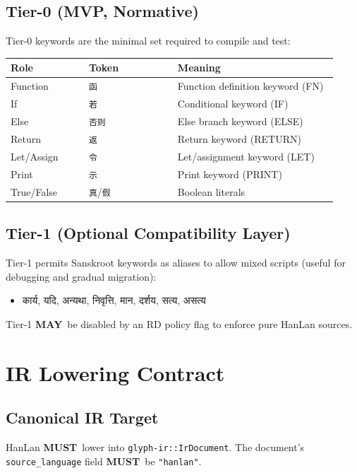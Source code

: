 \documentclass[12pt]{article}
\newcommand{\textdevanagarifont}[1]{{\devanagarifont #1}}
\newcommand{\MUST}{\textbf{MUST}}
\newcommand{\MAY}{\textbf{MAY}}
\begin{document}
\subsection{Tier-0 (MVP, Normative)}
Tier-0 keywords are the minimal set required to compile and test:
\begin{longtable}{p{0.22\linewidth}p{0.25\linewidth}p{0.45\linewidth}}
\textbf{Role} & \textbf{Token} & \textbf{Meaning} \\ \hline
Function & \texttt{函} & Function definition keyword (FN) \\
If & \texttt{若} & Conditional keyword (IF) \\
Else & \texttt{否则} & Else branch keyword (ELSE) \\
Return & \texttt{返} & Return keyword (RETURN) \\
Let/Assign & \texttt{令} & Let/assignment keyword (LET) \\
Print & \texttt{示} & Print keyword (PRINT) \\
True/False & \texttt{真}/\texttt{假} & Boolean literals \\
\end{longtable}

\subsection{Tier-1 (Optional Compatibility Layer)}
Tier-1 permits Sanskroot keywords as aliases to allow mixed scripts (useful for debugging and gradual migration):
\begin{itemize}[leftmargin=1.5em]
  \item \textdevanagarifont{कार्य}, \textdevanagarifont{यदि}, \textdevanagarifont{अन्यथा},
        \textdevanagarifont{निवृत्ति}, \textdevanagarifont{मान}, \textdevanagarifont{दर्शय},
        \textdevanagarifont{सत्य}, \textdevanagarifont{असत्य}
\end{itemize}
Tier-1 \MAY\ be disabled by an RD policy flag to enforce pure HanLan sources.

\section{IR Lowering Contract}
\subsection{Canonical IR Target}
HanLan \MUST\ lower into \texttt{glyph-ir::IrDocument}. The document's \texttt{source\_language} field
\MUST\ be \texttt{"hanlan"}.
\end{document}
